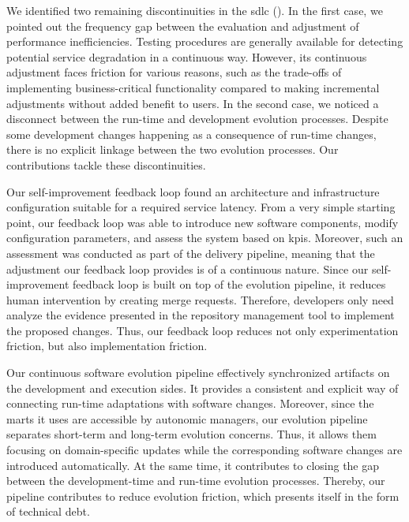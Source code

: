 We identified two remaining discontinuities in the \gls{sdlc} (). In the first case, we pointed out the frequency gap between the evaluation and adjustment of performance inefficiencies. Testing procedures are generally available for detecting potential service degradation in a continuous way. However, its continuous adjustment faces friction for various reasons, such as the trade-offs of implementing business-critical functionality compared to making incremental adjustments without added benefit to users. In the second case, we noticed a disconnect between the run-time and development evolution processes. Despite some development changes happening as a consequence of run-time changes, there is no explicit linkage between the two evolution processes. Our contributions tackle these discontinuities.

Our self-improvement feedback loop found an architecture and infrastructure configuration suitable for a required service latency. From a very simple starting point, our feedback loop was able to introduce new software components, modify configuration parameters, and assess the system based on \glspl{kpi}. Moreover, such an assessment was conducted as part of the delivery pipeline, meaning that the adjustment our feedback loop provides is of a continuous nature. Since our self-improvement feedback loop is built on top of the evolution pipeline, it reduces human intervention by creating merge requests. Therefore, developers only need analyze the evidence presented in the repository management tool to implement the proposed changes. Thus, our feedback loop reduces not only experimentation friction, but also implementation friction.

Our continuous software evolution pipeline effectively synchronized artifacts on the development and execution sides. It provides a consistent and explicit way of connecting run-time adaptations with software changes. Moreover, since the \glspl{mart} it uses are accessible by autonomic managers, our evolution pipeline separates short-term and long-term evolution concerns. Thus, it allows them focusing on domain-specific updates while the corresponding software changes are introduced automatically. At the same time, it contributes to closing the gap between the development-time and run-time evolution processes. Thereby, our pipeline contributes to reduce evolution friction, which presents itself in the form of technical debt.

%
%

